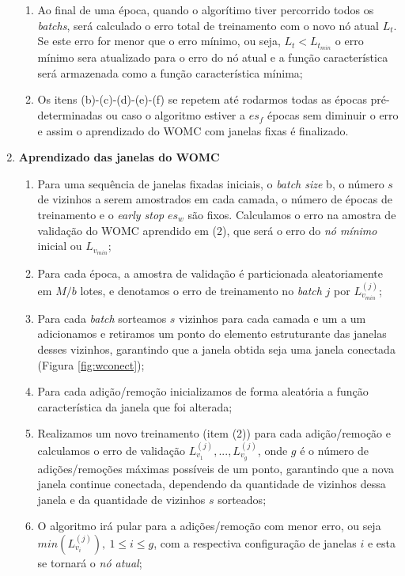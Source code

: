\begin{enumerate}
\begin{enumerate}
        \item Ao final de uma época, quando o algorítimo tiver percorrido todos os \textit{batchs}, será calculado o erro total de treinamento com o novo nó atual $L_{t}$. Se este erro for menor que o erro mínimo, ou seja, $L_{t}< L_{t_{min}}$ o erro mínimo sera atualizado para o erro do nó atual e a função característica será armazenada como a função característica mínima;
        \item Os itens (b)-(c)-(d)-(e)-(f) se repetem até rodarmos todas as épocas pré-determinadas ou caso o algoritmo estiver a $es_f$ épocas sem diminuir o erro e assim o aprendizado do WOMC com janelas fixas é finalizado.
    \end{enumerate}
    \item \textbf{Aprendizado das janelas do WOMC}
    \begin{enumerate}
        \item Para uma sequência de janelas fixadas iniciais, o \textit{batch size} b, o número $s$ de vizinhos a serem amostrados em cada camada, o número de épocas de treinamento e o \textit{early stop} $es_w$ são fixos. Calculamos o erro na amostra de validação do WOMC aprendido em (2), que será o erro do \textit{nó mínimo} inicial ou $L_{v_{min}}$;
        \item Para cada época, a amostra de validação é particionada aleatoriamente em $M/b$ lotes, e denotamos o erro de treinamento no \textit{batch} $j$ por  $L_{v_{min}}^{(j)}$;
        \item Para cada \textit{batch} sorteamos $s$ vizinhos para cada camada e um a um adicionamos e retiramos um ponto do elemento estruturante das janelas desses vizinhos, garantindo que a janela obtida seja uma janela conectada (Figura \ref{fig:wconect});
        \item Para cada adição/remoção inicializamos de forma aleatória a função característica da janela que foi alterada;
        \item Realizamos um novo treinamento (item (2)) para cada adição/remoção e calculamos o erro de validação $L_{v_{1}}^{(j)}, ..., L_{v_{g}}^{(j)}$, onde $g$ é o número de adições/remoções máximas possíveis de um ponto, garantindo que a nova janela continue conectada, dependendo da quantidade de vizinhos dessa janela e da quantidade de vizinhos $s$ sorteados; 
        \item O algoritmo irá pular para a adições/remoção com menor erro, ou seja $min \left(L_{v_{i}}^{(j)} \right), \ 1 \leq i \leq g$, com a respectiva configuração de janelas $i$ e esta se tornará o \textit{nó atual};

\end{enumerate}
\end{enumerate}
